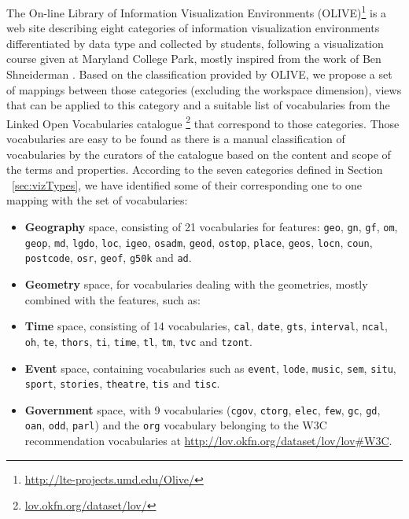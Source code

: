The On-line Library of Information Visualization Environments (OLIVE)\footnote{\url{http://lte-projects.umd.edu/Olive/}} is a web site describing eight categories of information visualization environments differentiated by data type and collected by students, following a visualization course given at Maryland College Park, mostly inspired from the work of Ben Shneiderman \cite{Shneiderman99}. Based on the classification provided by OLIVE, we propose a set of mappings between those categories (excluding the workspace dimension), views that can be applied to this category and a suitable list of vocabularies from the Linked Open Vocabularies catalogue \cite{lov11}\footnote{\url{lov.okfn.org/dataset/lov/}} that correspond to those categories. Those vocabularies are easy to be found as there is a manual classification of vocabularies by the curators of the catalogue based on the content and scope of the terms and properties. According to the seven categories defined in Section ~\ref{sec:vizTypes}, we have identified some of their corresponding one to one mapping with the set of vocabularies:
 \begin{itemize}
 \item \textbf{Geography} space, consisting of 21 vocabularies for features: \texttt{geo}, \texttt{gn}, \texttt{gf}, \texttt{om}, \texttt{geop}, \texttt{md}, \texttt{lgdo}, \texttt{loc}, \texttt{igeo}, \texttt{osadm}, \texttt{geod}, \texttt{ostop}, \texttt{place}, \texttt{geos}, \texttt{locn}, \texttt{coun}, \texttt{postcode}, \texttt{osr}, \texttt{geof}, \texttt{g50k} and \texttt{ad}.
 \item \textbf{Geometry} space, for vocabularies dealing with the geometries, mostly combined with the features, such as:
 \item \textbf{Time} space, consisting of 14 vocabularies, \texttt{cal}, \texttt{date}, \texttt{gts}, \texttt{interval}, \texttt{ncal}, \texttt{oh}, \texttt{te}, \texttt{thors}, \texttt{ti}, \texttt{time}, \texttt{tl}, \texttt{tm}, \texttt{tvc} and \texttt{tzont}.
 \item \textbf{Event} space, containing vocabularies such  as \texttt{event}, \texttt{lode}, \texttt{music}, \texttt{sem}, \texttt{situ}, \texttt{sport}, \texttt{stories}, \texttt{theatre}, \texttt{tis} and \texttt{tisc}.
 \item \textbf{Government} space, with 9 vocabularies (\texttt{cgov}, \texttt{ctorg}, \texttt{elec}, \texttt{few}, \texttt{gc}, \texttt{gd}, \texttt{oan}, \texttt{odd}, \texttt{parl}) and the \texttt{org} vocabulary belonging to the W3C recommendation vocabularies at \url{ http://lov.okfn.org/dataset/lov/lov#W3C}.
 \end{itemize}
